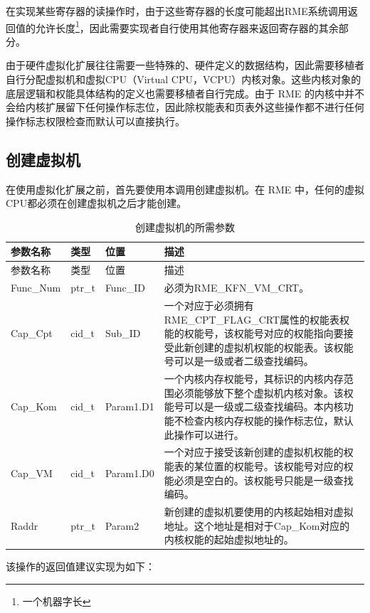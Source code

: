 在实现某些寄存器的读操作时，由于这些寄存器的长度可能超出RME系统调用返回值的允许长度\footnote{一个机器字长}，因此需要实现者自行使用其他寄存器来返回寄存器的其余部分。

由于硬件虚拟化扩展往往需要一些特殊的、硬件定义的数据结构，因此需要移植者自行分配虚拟机和虚拟CPU（Virtual
CPU，VCPU）内核对象。这些内核对象的底层逻辑和权能具体结构的定义也需要移植者自行完成。由于 RME 的内核中并不会给内核扩展留下任何操作标志位，因此除权能表和页表外这些操作都不进行任何操作标志权限检查而默认可以直接执行。

\subsection{创建虚拟机}\label{subsec:8-create-virtual-machine}

在使用虚拟化扩展之前，首先要使用本调用创建虚拟机。在 RME 中，任何的虚拟CPU都必须在创建虚拟机之后才能创建。

\begin{xltabular}{\textwidth}{@{}>{\hsize\raggedright\arraybackslash}X>{\hsize\raggedright\arraybackslash}X>{\hsize\raggedright\arraybackslash}X>{\hsize\raggedright\arraybackslash}X@{}}
\caption{创建虚拟机的所需参数}\label{tab:8-73-create-virtual-machine-parameters}\\
\toprule
参数名称 & 类型 & 位置 & 描述\tabularnewline
\endfirsthead
\toprule
参数名称 & 类型 & 位置 & 描述\tabularnewline
\midrule
\endhead
\bottomrule
\endlastfoot
Func\_Num & ptr\_t & Func\_ID & 必须为RME\_KFN\_VM\_CRT。\tabularnewline
Cap\_Cpt & cid\_t & Sub\_ID &
一个对应于必须拥有RME\_CPT\_FLAG\_CRT属性的权能表权能的权能号，该权能号对应的权能指向要接受此新创建的虚拟机权能的权能表。该权能号可以是一级或者二级查找编码。\tabularnewline
Cap\_Kom & cid\_t & Param1.D1 &
一个内核内存权能号，其标识的内核内存范围必须能够放下整个虚拟机内核对象。该权能号可以是一级或二级查找编码。本内核功能不检查内核内存权能的操作标志位，默认此操作可以进行。\tabularnewline
Cap\_VM & cid\_t & Param1.D0 &
一个对应于接受该新创建的虚拟机权能的权能表的某位置的权能号。该权能号对应的权能必须是空白的。该权能号只能是一级查找编码。\tabularnewline
Raddr & ptr\_t & Param2 &
新创建的虚拟机要使用的内核起始相对虚拟地址。这个地址是相对于Cap\_Kom对应的内核权能的起始虚拟地址的。\tabularnewline
\end{xltabular}

该操作的返回值建议实现为如下：

